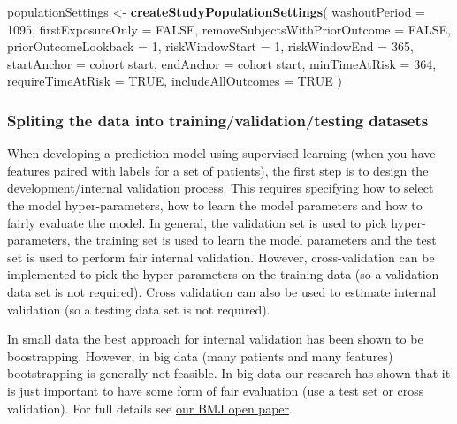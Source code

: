 \documentclass[
]{article}
\newenvironment{Shaded}{\begin{snugshade}}{\end{snugshade}}
\newcommand{\AttributeTok}[1]{\textcolor[rgb]{0.13,0.29,0.53}{#1}}
\newcommand{\ConstantTok}[1]{\textcolor[rgb]{0.56,0.35,0.01}{#1}}
\newcommand{\DecValTok}[1]{\textcolor[rgb]{0.00,0.00,0.81}{#1}}
\newcommand{\FunctionTok}[1]{\textcolor[rgb]{0.13,0.29,0.53}{\textbf{#1}}}
\newcommand{\NormalTok}[1]{#1}
\newcommand{\OtherTok}[1]{\textcolor[rgb]{0.56,0.35,0.01}{#1}}
\newcommand{\StringTok}[1]{\textcolor[rgb]{0.31,0.60,0.02}{#1}}
\begin{document}
\begin{Shaded}
\begin{Highlighting}[]
\NormalTok{  populationSettings }\OtherTok{\textless{}{-}} \FunctionTok{createStudyPopulationSettings}\NormalTok{(}
  \AttributeTok{washoutPeriod =} \DecValTok{1095}\NormalTok{,}
  \AttributeTok{firstExposureOnly =} \ConstantTok{FALSE}\NormalTok{,}
  \AttributeTok{removeSubjectsWithPriorOutcome =} \ConstantTok{FALSE}\NormalTok{,}
  \AttributeTok{priorOutcomeLookback =} \DecValTok{1}\NormalTok{,}
  \AttributeTok{riskWindowStart =} \DecValTok{1}\NormalTok{,}
  \AttributeTok{riskWindowEnd =} \DecValTok{365}\NormalTok{,}
  \AttributeTok{startAnchor =}  \StringTok{\textquotesingle{}cohort start\textquotesingle{}}\NormalTok{,}
  \AttributeTok{endAnchor =}  \StringTok{\textquotesingle{}cohort start\textquotesingle{}}\NormalTok{,}
  \AttributeTok{minTimeAtRisk =} \DecValTok{364}\NormalTok{,}
  \AttributeTok{requireTimeAtRisk =} \ConstantTok{TRUE}\NormalTok{,}
  \AttributeTok{includeAllOutcomes =} \ConstantTok{TRUE}
\NormalTok{  )}
\end{Highlighting}
\end{Shaded}

\hypertarget{spliting-the-data-into-trainingvalidationtesting-datasets}{%
\subsubsection{Spliting the data into training/validation/testing
datasets}\label{spliting-the-data-into-trainingvalidationtesting-datasets}}

When developing a prediction model using supervised learning (when you
have features paired with labels for a set of patients), the first step
is to design the development/internal validation process. This requires
specifying how to select the model hyper-parameters, how to learn the
model parameters and how to fairly evaluate the model. In general, the
validation set is used to pick hyper-parameters, the training set is
used to learn the model parameters and the test set is used to perform
fair internal validation. However, cross-validation can be implemented
to pick the hyper-parameters on the training data (so a validation data
set is not required). Cross validation can also be used to estimate
internal validation (so a testing data set is not required).

In small data the best approach for internal validation has been shown
to be boostrapping. However, in big data (many patients and many
features) bootstrapping is generally not feasible. In big data our
research has shown that it is just important to have some form of fair
evaluation (use a test set or cross validation). For full details see
\href{add\%20link}{our BMJ open paper}.
\end{document}
